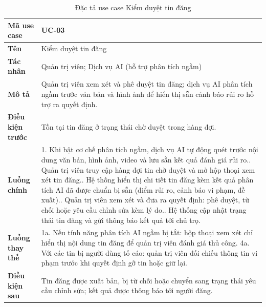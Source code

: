 \begin{table}[!ht]
\centering
\caption{Đặc tả use case Kiểm duyệt tin đăng}
\label{tab:uc-moderate}
\begin{tabular}{p{} p{}}
\hline
\textbf{Mã use case} & UC-03 \\
\hline
\textbf{Tên} & Kiểm duyệt tin đăng \\
\hline
\textbf{Tác nhân} & Quản trị viên; Dịch vụ AI (hỗ trợ phân tích ngầm) \\
\hline
\textbf{Mô tả} & Quản trị viên xem xét và phê duyệt tin đăng; dịch vụ AI phân tích ngầm trước văn bản và hình ảnh để hiển thị sẵn cảnh báo rủi ro hỗ trợ ra quyết định. \\
\hline
\textbf{Điều kiện trước} & Tồn tại tin đăng ở trạng thái chờ duyệt trong hàng đợi. \\
\hline
\textbf{Luồng chính} & 1. Khi bật cơ chế phân tích ngầm, dịch vụ AI tự động quét trước nội dung văn bản, hình ảnh, video và lưu sẵn kết quả đánh giá rủi ro.\newline
2. Quản trị viên truy cập hàng đợi tin chờ duyệt và mở hộp thoại xem xét tin đăng.\newline
3. Hệ thống hiển thị chi tiết tin đăng kèm kết quả phân tích AI đã được chuẩn bị sẵn (điểm rủi ro, cảnh báo vi phạm, đề xuất).\newline
4. Quản trị viên xem xét và đưa ra quyết định: phê duyệt, từ chối hoặc yêu cầu chỉnh sửa kèm lý do.\newline
5. Hệ thống cập nhật trạng thái tin đăng và gửi thông báo kết quả tới chủ trọ. \\
\hline
\textbf{Luồng thay thế} & 1a. Nếu tính năng phân tích AI ngầm bị tắt: hộp thoại xem xét chỉ hiển thị nội dung tin đăng để quản trị viên đánh giá thủ công.\newline
4a. Với các tin bị người dùng tố cáo: quản trị viên đối chiếu thông tin vi phạm trước khi quyết định gỡ tin hoặc giữ lại. \\
\hline
\textbf{Điều kiện sau} & Tin đăng được xuất bản, bị từ chối hoặc chuyển sang trạng thái yêu cầu chỉnh sửa; kết quả được thông báo tới người đăng. \\
\hline
\end{tabular}
\end{table}

